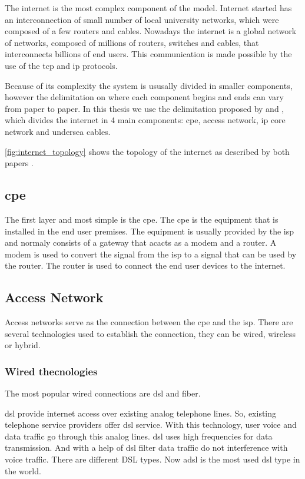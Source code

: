The internet is the most complex component of the model.
Internet started has an interconnection of small number of local university networks, which were composed of a few routers and cables. Nowadays the internet is a global network of networks, composed of millions of routers, switches and cables, that interconnects billions of end users. This communication is made possible by the use of the \ac{tcp} and \ac{ip} protocols.

Because of its complexity the system is ususally divided in smaller components, however the delimitation on where each component begins and ends can vary from paper to paper. In this thesis we use the delimitation proposed by \citet{Coroama2015} and \citet{Schien2015}, which divides the internet in 4 main components: \ac{cpe}, access network, \ac{ip} core network and undersea cables.

\ref{fig:internet_topology} shows the topology of the internet as described by both papers \cite{Coroama2015} \cite{Schien2015}. 

\subsection{\acl{cpe}}

The first layer and most simple is the \ac{cpe}. The \ac{cpe} is the equipment that is installed in the end user premises. 
The equipment is usually provided by the \ac{isp} and normaly consists of a gateway that acacts as a modem and a router.
A modem is used to convert the signal from the \ac{isp} to a signal that can be used by the router. The router is used to connect the end user devices to the internet.

\subsection{Access Network}

Access networks serve as the connection between the \ac{cpe} and the \ac{isp}. 
There are several technologies used to establish the connection, they can be wired, wireless or hybrid.

\subsubsection{Wired thecnologies}

The most popular wired connections are \ac{dsl} and fiber.

\ac{dsl} provide internet access over existing analog telephone lines. So, existing telephone service providers offer \ac{dsl} service. With this technology, user voice and data traffic go through this analog lines. \ac{dsl} uses high frequencies for data transmission. And with a help of \ac{dsl} filter data traffic do not interference with voice traffic.
There are different DSL types. Now \ac{adsl} is the most used \ac{dsl} type in the world. 

